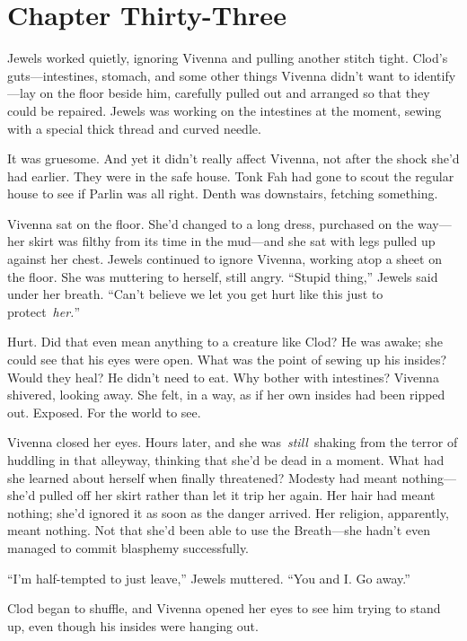 \section{Chapter Thirty-Three}

Jewels worked quietly, ignoring Vivenna and pulling another stitch tight. Clod’s guts—intestines, stomach, and some other things Vivenna didn’t want to identify—lay on the floor beside him, carefully pulled out and arranged so that they could be repaired. Jewels was working on the intestines at the moment, sewing with a special thick thread and curved needle.

It was gruesome. And yet it didn’t really affect Vivenna, not after the shock she’d had earlier. They were in the safe house. Tonk Fah had gone to scout the regular house to see if Parlin was all right. Denth was downstairs, fetching something.

Vivenna sat on the floor. She’d changed to a long dress, purchased on the way—her skirt was filthy from its time in the mud—and she sat with legs pulled up against her chest. Jewels continued to ignore Vivenna, working atop a sheet on the floor. She was muttering to herself, still angry. “Stupid thing,” Jewels said under her breath. “Can’t believe we let you get hurt like this just to protect~\textit{her.}”

Hurt. Did that even mean anything to a creature like Clod? He was awake; she could see that his eyes were open. What was the point of sewing up his insides? Would they heal? He didn’t need to eat. Why bother with intestines? Vivenna shivered, looking away. She felt, in a way, as if her own insides had been ripped out. Exposed. For the world to see.

Vivenna closed her eyes. Hours later, and she was~\textit{still}~shaking from the terror of huddling in that alleyway, thinking that she’d be dead in a moment. What had she learned about herself when finally threatened? Modesty had meant nothing—she’d pulled off her skirt rather than let it trip her again. Her hair had meant nothing; she’d ignored it as soon as the danger arrived. Her religion, apparently, meant nothing. Not that she’d been able to use the Breath—she hadn’t even managed to commit blasphemy successfully.

“I’m half-tempted to just leave,” Jewels muttered. “You and I. Go away.”

Clod began to shuffle, and Vivenna opened her eyes to see him trying to stand up, even though his insides were hanging out.

